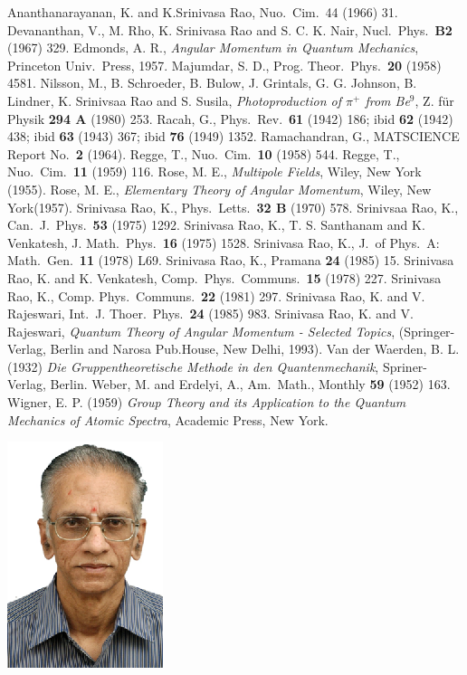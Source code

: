 \begin{thebibliography}{99}
 Ananthanarayanan, K. and K.Srinivasa Rao, Nuo.\ Cim.\ 44 (1966) 31.
 Devananthan, V., M. Rho, K. Srinivasa Rao and S. C. K. Nair, Nucl.\ Phys.\ {\bf B2} (1967) 329.
 Edmonds, A. R., \textit{Angular Momentum in Quantum Mechanics}, Princeton Univ.\ Press, 1957.
 Majumdar, S. D., Prog. Theor.\ Phys.\ {\bf 20} (1958) 4581.
 Nilsson, M., B. Schroeder, B. Bulow, J. Grintals, G. G. Johnson, B. Lindner, K. Srinivsaa Rao and S. Susila, \textit{Photoproduction of $\pi^+$ from Be$^9$}, Z. f\"{u}r Physik {\bf 294 A} (1980) 253.
 Racah, G., Phys.\ Rev.\ {\bf 61} (1942) 186; ibid {\bf 62} (1942) 438; ibid {\bf 63} (1943) 367; ibid {\bf 76} (1949) 1352.
 Ramachandran, G., MATSCIENCE Report No.\ {\bf 2} (1964).
 Regge, T., Nuo.\ Cim.\ {\bf 10} (1958) 544.
 Regge, T., Nuo.\ Cim.\ {\bf 11} (1959) 116.
 Rose, M. E., \textit{Multipole Fields}, Wiley, New York (1955).
 Rose, M. E., \textit{Elementary Theory of Angular Momentum}, Wiley, New York(1957).
 Srinivasa Rao, K., Phys.\ Letts.\ {\bf 32 B} (1970) 578.
 Srinivsaa Rao, K., Can.\ J.\ Phys.\ {\bf 53} (1975) 1292.
 Srinivasa Rao, K., T. S. Santhanam and K. Venkatesh, J. Math.\ Phys.\ {\bf 16} (1975) 1528.
 Srinivasa Rao, K., J.\ of Phys.\ A: Math.\ Gen.\ {\bf 11} (1978) L69.
 Srinivasa Rao, K., Pramana {\bf 24} (1985) 15.
 Srinivasa Rao, K. and K. Venkatesh, Comp.\ Phys.\ Communs.\ {\bf 15} (1978) 227.
 Srinivasa Rao, K., Comp. Phys.\ Communs.\ {\bf 22} (1981) 297.
 Srinivasa Rao, K. and V. Rajeswari, Int.\ J. Thoer.\ Phys.\ {\bf 24} (1985) 983.
 Srinivasa Rao, K. and V. Rajeswari, \textit{Quantum Theory of Angular Momentum - Selected Topics}, (Springer-Verlag, Berlin and Narosa Pub.House, New Delhi, 1993).
 Van der Waerden, B. L. (1932) \textit{Die Gruppentheoretische Methode in den Quantenmechanik}, Spriner-Verlag, Berlin.
 Weber, M. and Erdelyi, A., Am.\ Math., Monthly {\bf 59} (1952) 163.
 Wigner, E. P. (1959) \textit{Group Theory and its Application to the Quantum Mechanics of Atomic Spectra}, Academic Press, New York.
\end{thebibliography}
\vskip 1cm

\centerline{\includegraphics[scale=1.4]{figures/authors/K_Srinivasa_Rao_photo.eps}}
\smallskip


